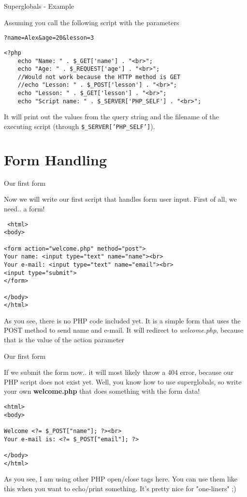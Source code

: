 \begin{frame}[fragile]{Superglobals - Example}

	Assuming you call the following script with the parameters 
	
	\texttt{?name=Alex\&{}age=20\&{}lesson=3}
	
	\begin{lstlisting}
<?php
	echo "Name: " . $_GET['name'] . "<br>";
	echo "Age: " . $_REQUEST['age'] . "<br>";
	//Would not work because the HTTP method is GET
	//echo "Lesson: " . $_POST['lesson'] . "<br>";
	echo "Lesson: " . $_GET['lesson'] . "<br>";
	echo "Script name: " . $_SERVER['PHP_SELF'] . "<br>";
	\end{lstlisting}
	
	It will print out the values from the query string and the filename of the executing script (through \texttt{\$\_{}SERVER['PHP\_{}SELF']}). 
\end{frame}

\section{Form Handling}

\begin{frame}[fragile]{Our first form}

	Now we will write our first script that handles form user input. First of all, we need.. a form! \pause
	
	\begin{lstlisting}
 <html>
<body>

<form action="welcome.php" method="post">
Your name: <input type="text" name="name"><br>
Your e-mail: <input type="text" name="email"><br>
<input type="submit">
</form>

</body>
</html> 
	\end{lstlisting}
	\pause
	
	As you see, there is no PHP code included yet. It is a simple form that uses the POST method to send name and e-mail. It will redirect to \emph{welcome.php}, because that is the value of the action parameter
\end{frame}

\begin{frame}[fragile]{Our first form}

	If we submit the form now.. it will most likely throw a 404 error, because our PHP script does not exist yet. Well, you know how to use superglobals, so write your own \textbf{welcome.php} that does something with the form data! \pause
	
	\begin{lstlisting}
<html>
<body>

Welcome <?= $_POST["name"]; ?><br>
Your e-mail is: <?= $_POST["email"]; ?>

</body>
</html> 
	\end{lstlisting}
	\pause
	
	As you see, I am using other PHP open/close tags here. You can use them like this when you want to echo/print something. It's pretty nice for "one-liners" ;)
\end{frame}

